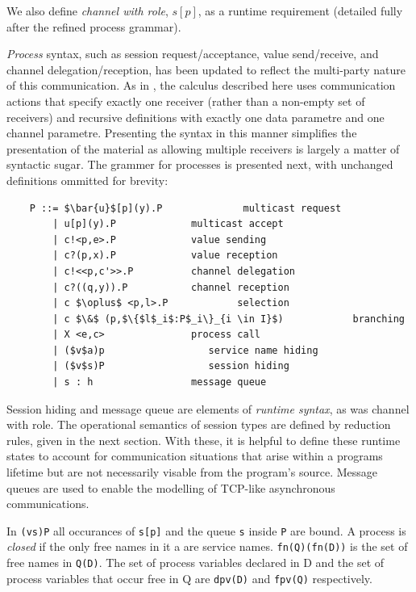 \documentclass[11pt]{scrartcl}
\begin{document}
We also define \emph{channel with role}, $s[p]$, as a runtime requirement
(detailed fully after the refined process grammar).

\emph{Process} syntax, such as session request/acceptance, value 
send/receive, and channel delegation/reception, has been updated to reflect
the multi-party nature of this communication. As in \cite{CCPY15}, the 
calculus described here uses communication actions that specify exactly
one receiver (rather than a non-empty set of receivers) and recursive
definitions with exactly one data parametre and one channel parametre. Presenting
the syntax in this manner simplifies the presentation of the material as
allowing multiple receivers is largely a matter of syntactic sugar. The grammer
for processes is presented next, with unchanged definitions ommitted for brevity:
\\

\begin{lstlisting}
    P ::= $\bar{u}$[p](y).P              multicast request
        | u[p](y).P             multicast accept
        | c!<p,e>.P             value sending
        | c?(p,x).P             value reception
        | c!<<p,c'>>.P          channel delegation
        | c?((q,y)).P           channel reception
        | c $\oplus$ <p,l>.P            selection
        | c $\&$ (p,$\{$l$_i$:P$_i\}_{i \in I}$)            branching
        | X <e,c>               process call
        | ($v$a)p                  service name hiding
        | ($v$s)P                  session hiding
        | s : h                 message queue
\end{lstlisting}

Session hiding and message queue are elements of \emph{runtime syntax}, 
as was channel with role. The operational semantics of session types are
defined by reduction rules, given in the next section. With these, it is
helpful to define these runtime states to account for communication situations
that arise within a programs lifetime but are not necessarily visable from
the program's source. Message queues are used to enable the modelling of
TCP-like asynchronous communications.

In \texttt{(vs)P} all occurances of \texttt{s[p]} and the queue \texttt{s}
inside \texttt{P} are bound. A process is \emph{closed} if the only free 
names in it a are service names. \texttt{fn(Q)(fn(D))} is the set of free 
names in \texttt{Q(D)}. The set of process variables declared in D and the 
set of process variables that occur free in Q are \texttt{dpv(D)} and 
\texttt{fpv(Q)} respectively.
\end{document}
